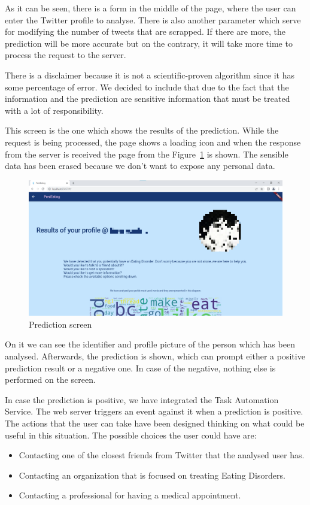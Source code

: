 As it can be seen, there is a form in the middle of the page, where the user can enter the Twitter profile to analyse. There is also another parameter which serve for modifying the number of tweets that are scrapped. If there are more, the prediction will be more accurate but on the contrary, it will take more time to process the request to the server.

There is a disclaimer because it is not a scientific-proven algorithm since it has some percentage of error. We decided to include that due to the fact that the information and the prediction are sensitive information that must be treated with a lot of responsibility.


This screen is the one which shows the results of the prediction. While the request is being processed, the page shows a loading icon and when the response from the server is received the page from the Figure~\ref{fig:predictionscreen} is shown. The sensible data has been erased because we don't want to expose any personal data.

\begin{figure}[!htp]
    \centering
    \includegraphics[scale=0.23]{img/case/predictionscreen.png}
    \caption{Prediction screen}
    \label{fig:predictionscreen}
\end{figure}

On it we can see the identifier and profile picture of the person which has been analysed. Afterwards, the prediction is shown, which can prompt either a positive prediction result or a negative one. In case of the negative, nothing else is performed on the screen.

In case the prediction is positive, we have integrated the Task Automation Service. The web server triggers an event against it when a prediction is positive. The actions that the user can take have been designed thinking on what could be useful in this situation. The possible choices the user could have are:
\begin{itemize}
    \item Contacting one of the closest friends from Twitter that the analysed user has.
    \item Contacting an organization that is focused on treating Eating Disorders.
    \item Contacting a professional for having a medical appointment.
\end{itemize}

